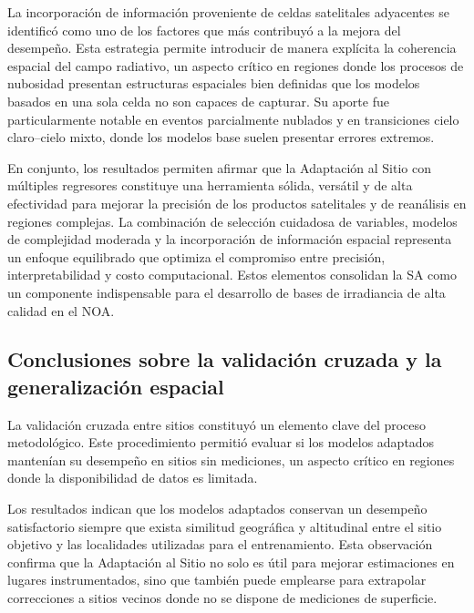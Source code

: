\documentclass[letterpaper,12pt, twoside]{report}
\providecommand{\DIFdeltex}[1]{{\protect\color{red} \scriptsize #1}} %
\providecommand{\DIFdel}[1]{\texorpdfstring{\DIFdeltex{#1}}{}} %
\begin{document}
\DIFdel{La incorporación de información proveniente de celdas satelitales adyacentes se identificó como uno de los factores que más contribuyó a la mejora del desempeño. Esta estrategia permite introducir de manera explícita la coherencia espacial del campo radiativo, un aspecto crítico en regiones donde los procesos de nubosidad presentan estructuras espaciales bien definidas que los modelos basados en una sola celda no son capaces de capturar. Su aporte fue particularmente notable en eventos parcialmente nublados y en transiciones cielo claro–cielo mixto, donde los modelos base suelen presentar errores extremos.
}%

\DIFdel{En conjunto, los resultados permiten afirmar que la Adaptación al Sitio con múltiples regresores constituye una herramienta sólida, versátil y de alta efectividad para mejorar la precisión de los productos satelitales y de reanálisis en regiones complejas. La combinación de selección cuidadosa de variables, modelos de complejidad moderada y la incorporación de información espacial representa un enfoque equilibrado que optimiza el compromiso entre precisión, interpretabilidad y costo computacional. Estos elementos consolidan la SA como un componente indispensable para el desarrollo de bases de irradiancia de alta calidad en el NOA.
}%

\subsection{\DIFdel{Conclusiones sobre la validación cruzada y la generalización espacial}}
\addtocounter{subsection}{-1}%

\DIFdel{La validación cruzada entre sitios constituyó un elemento clave del proceso metodológico. Este procedimiento permitió evaluar si los modelos adaptados mantenían su desempeño en sitios sin mediciones, un aspecto crítico en regiones donde la disponibilidad de datos es limitada.
}%

\DIFdel{Los resultados indican que los modelos adaptados conservan un desempeño satisfactorio siempre que exista similitud geográfica y altitudinal entre el sitio objetivo y las localidades utilizadas para el entrenamiento. Esta observación confirma que la Adaptación al Sitio no solo es útil para mejorar estimaciones en lugares instrumentados, sino que también puede emplearse para extrapolar correcciones a sitios vecinos donde no se dispone de mediciones de superficie.
}%
\end{document}
